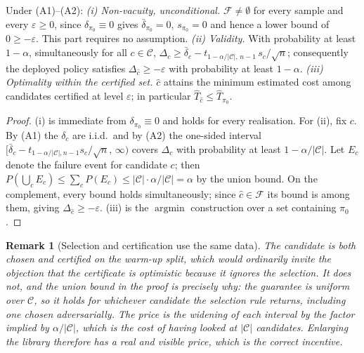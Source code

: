 \documentclass[acmsmall]{acmart}
\theoremstyle{acmdefinition}%
\newtheorem{remark}[theorem]{Remark}%
\theoremstyle{acmplain}}{}%
\begin{document}
\begin{theorem}\label{thm:risk}
Under \textup{(A1)}--\textup{(A2)}:
\emph{(i) Non-vacuity, unconditional.} $\mathcal{F}\neq\emptyset$ for every sample and every $\varepsilon\geq0$, since $\delta_{\pi_0}\equiv 0$ gives $\bar\delta_{\pi_0}=0$, $s_{\pi_0}=0$ and hence a lower bound of $0 \geq -\varepsilon$. This part requires no assumption.
\emph{(ii) Validity.} With probability at least $1-\alpha$, simultaneously for all $c\in\mathcal{C}$, $\Delta_c \geq \bar\delta_c - t_{1-\alpha/|\mathcal{C}|,\,n-1}\,s_c/\sqrt{n}$; consequently the deployed policy satisfies $\Delta_{\hat c} \geq -\varepsilon$ with probability at least $1-\alpha$.
\emph{(iii) Optimality within the certified set.} $\hat c$ attains the minimum estimated cost among candidates certified at level $\varepsilon$; in particular $\hat T_{\hat c} \leq \hat T_{\pi_0}$.
\end{theorem}

\begin{proof}
(i) is immediate from $\delta_{\pi_0}\equiv0$ and holds for every realisation. For (ii), fix $c$. By (A1) the $\delta_c$ are i.i.d.\ and by (A2) the one-sided interval $[\bar\delta_c - t_{1-\alpha/|\mathcal{C}|,n-1}s_c/\sqrt{n},\,\infty)$ covers $\Delta_c$ with probability at least $1-\alpha/|\mathcal{C}|$. Let $E_c$ denote the failure event for candidate $c$; then $P(\bigcup_{c}E_c) \leq \sum_{c} P(E_c) \leq |\mathcal{C}|\cdot\alpha/|\mathcal{C}| = \alpha$ by the union bound. On the complement, every bound holds simultaneously; since $\hat c\in\mathcal{F}$ its bound is among them, giving $\Delta_{\hat c} \geq -\varepsilon$. (iii) is the $\operatorname{argmin}$ construction over a set containing $\pi_0$.
\end{proof}

\begin{remark}[Selection and certification use the same data]
The candidate is both chosen and certified on the warm-up split, which would ordinarily invite the objection that the certificate is optimistic because it ignores the selection. It does not, and the union bound in the proof is precisely why: the guarantee is uniform over $\mathcal{C}$, so it holds for \emph{whichever} candidate the selection rule returns, including one chosen adversarially. The price is the widening of each interval by the factor implied by $\alpha/|\mathcal{C}|$, which is the cost of having looked at $|\mathcal{C}|$ candidates. Enlarging the library therefore has a real and visible price, which is the correct incentive.
\end{remark}
\end{document}
